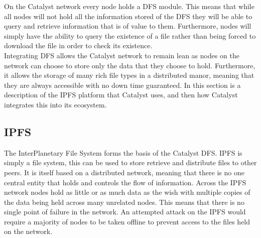 \documentclass{article}
\begin{document}
On the Catalyst network every node holds a DFS module. This means that while all nodes will not hold all the information stored of the DFS they will be able to query and retrieve information that is of value to them. Furthermore, nodes will simply have the ability to query the existence of a file rather than being forced to download the file in order to check
its existence. \\                                                                                                                                                                                                                                                                                                                                                                                                                                                                                                                                                                                                                                                                                                                                                                                                                                                                                                                                                                                                                                                                                                                                                       

Integrating DFS allows the Catalyst network to remain lean as nodes on the network can choose to store only the data that they choose to hold. Furthermore, it allows the storage of many rich file types in a distributed manor, meaning that they are always accessible with no down time guaranteed. In this section is a description of the IPFS platform that Catalyst uses, and then how Catalyst integrates this into its ecosystem. 


\subsection{IPFS}

The InterPlanetary File System forms the basis of the Catalyst DFS. IPFS is simply a file system, this can be used to store retrieve and distribute files to other peers. It is itself based on a distributed network, meaning that there is no one central entity that holds and controls the flow of information. Across the IPFS network nodes hold as little or as much data as the wish with multiple copies of the data being held across many unrelated nodes. This means that there is no single point of failure in the network. An attempted attack on the IPFS would require a majority of nodes to be taken offline to prevent access to the files held on the network.   \\
\end{document}
